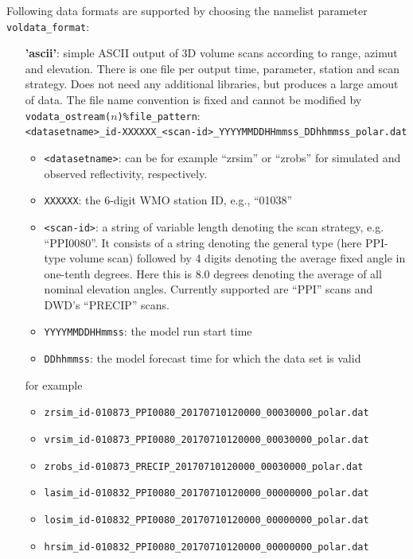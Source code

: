 \documentclass[10pt,a4paper,twoside,headinclude,footinclude,parskip=half]{scrartcl}
\newcommand{\srcform}[1]{\mbox{\texttt{#1}}\xspace}%
\newcommand{\paramform}[1]{\mbox{\texttt{#1}}\xspace}%
\begin{document}
Following data formats are supported by choosing the namelist parameter \srcform{voldata_format}:
  \begin{itemize}
  \item[\textbf{'ascii'}:] simple ASCII output of 3D volume scans according to range, azimut and elevation.
    There is one file per output time, parameter, station and scan strategy. Does not need any additional libraries, but
    produces a large amout of data. The file name convention is fixed and cannot be modified by \paramform{vodata_ostream($n$)\%file_pattern}:\\[0.5em]
    \verb|<datasetname>_id-XXXXXX_<scan-id>_YYYYMMDDHHmmss_DDhhmmss_polar.dat|
    \begin{itemize}
      \item \verb|<datasetname>|: can be for example ``zrsim'' or ``zrobs'' for simulated and observed reflectivity, respectively.    
      \item \verb|XXXXXX|: the 6-digit WMO station ID, e.g., ``01038''
      \item \verb|<scan-id>|: a string of variable length denoting the scan strategy, e.g. ``PPI0080''. It consists of a string denoting
        the general type (here PPI-type volume scan) followed by 4 digits denoting the average fixed angle in one-tenth degrees. 
        Here this is 8.0 degrees denoting the average of all nominal elevation angles. Currently supported are ``PPI'' scans and DWD's ``PRECIP'' scans.
      \item \verb|YYYYMMDDHHmmss|: the model run start time
      \item \verb|DDhhmmss|: the model forecast time for which the data set is valid
    \end{itemize}
    for example
    \begin{itemize}
      \item \verb|zrsim_id-010873_PPI0080_20170710120000_00030000_polar.dat|
      \item \verb|vrsim_id-010873_PPI0080_20170710120000_00030000_polar.dat|
      \item \verb|zrobs_id-010873_PRECIP_20170710120000_00030000_polar.dat|
      \item \verb|lasim_id-010832_PPI0080_20170710120000_00000000_polar.dat|
      \item \verb|losim_id-010832_PPI0080_20170710120000_00000000_polar.dat|
      \item \verb|hrsim_id-010832_PPI0080_20170710120000_00000000_polar.dat|
    \end{itemize}

\end{itemize}
\end{document}
